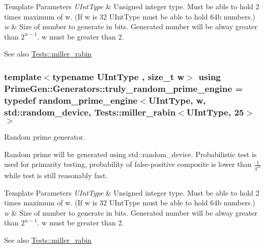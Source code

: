 \begin{DoxyTemplParams}{Template Parameters}
{\em U\+Int\+Type} & Unsigned integer type. Must be able to hold 2 times maximum of {\ttfamily w}. (If {\ttfamily w} is 32 {\ttfamily U\+Int\+Type} must be able to hold 64b numbers.) \\
\hline
{\em w} & Size of number to generate in bits. Generated number will be alway greater than $ 2^{w-1} $. {\ttfamily w} must be greater than 2.\\
\hline
\end{DoxyTemplParams}
\begin{DoxySeeAlso}{See also}
\hyperlink{namespace_prime_gen_1_1_tests_ab4ab789bde1badebff58de914a31afb3}{Tests\+::miller\+\_\+rabin} 
\end{DoxySeeAlso}
\hypertarget{namespace_prime_gen_1_1_generators_a49f5680053be25ced5f6b2cf3a49cd4e}{
\subsubsection[{truly\+\_\+random\+\_\+prime\+\_\+engine}]{\setlength{\rightskip}{0pt plus 5cm}template$<$typename U\+Int\+Type , size\+\_\+t w$>$ using {\bf Prime\+Gen\+::\+Generators\+::truly\+\_\+random\+\_\+prime\+\_\+engine} = typedef {\bf random\+\_\+prime\+\_\+engine}$<$U\+Int\+Type, w, std\+::random\+\_\+device, {\bf Tests\+::miller\+\_\+rabin}$<$U\+Int\+Type, 25$>$$>$}}\label{namespace_prime_gen_1_1_generators_a49f5680053be25ced5f6b2cf3a49cd4e}


Random prime generator. 

Random prime will be generated using {\ttfamily std\+::random\+\_\+device}. Probabilistic test is used for primarity testing, probability of false-\/positive composite is lower than $ \frac{1}{4^{25}} $ while test is still reasonably fast.


\begin{DoxyTemplParams}{Template Parameters}
{\em U\+Int\+Type} & Unsigned integer type. Must be able to hold 2 times maximum of {\ttfamily w}. (If {\ttfamily w} is 32 {\ttfamily U\+Int\+Type} must be able to hold 64b numbers.) \\
\hline
{\em w} & Size of number to generate in bits. Generated number will be alway greater than $ 2^{w-1} $. {\ttfamily w} must be greater than 2.\\
\hline
\end{DoxyTemplParams}
\begin{DoxySeeAlso}{See also}
\hyperlink{namespace_prime_gen_1_1_tests_ab4ab789bde1badebff58de914a31afb3}{Tests\+::miller\+\_\+rabin} 
\end{DoxySeeAlso}


